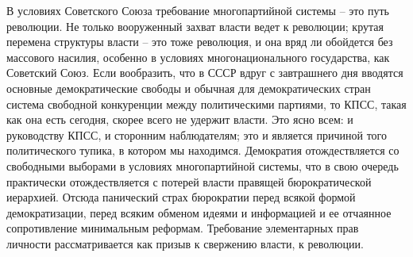 \documentclass{book}
\begin{document}
В условиях Советского Союза требование многопартийной системы -- это путь революции. Не только вооруженный захват власти ведет к революции; крутая перемена структуры вла­сти -- это тоже революция, и она вряд ли обойдется без массо­вого насилия, особенно в условиях многонационального госу­дарства, как Советский Союз. Если вообразить, что в СССР вдруг с завтрашнего дня вводятся основные демократические свободы и обычная для демократических стран система сво­бодной конкуренции между политическими партиями, то КПСС, такая как она есть сегодня, скорее всего не удержит власти. Это ясно всем: и руководству КПСС, и сторонним наблюдате­лям; это и является причиной того политического тупика, в котором мы находимся. Демократия отождествляется со сво­бодными выборами в условиях многопартийной системы, что в свою очередь практически отождествляется с потерей влас­ти правящей бюрократической иерархией. Отсюда панический страх бюрократии перед всякой формой демократизации, перед всяким обменом идеями и информацией и ее 
отчаянное сопро­тивление минимальным реформам. Требование элементарных прав личности рассматривается как призыв к свержению вла­сти, к революции.
\end{document}

